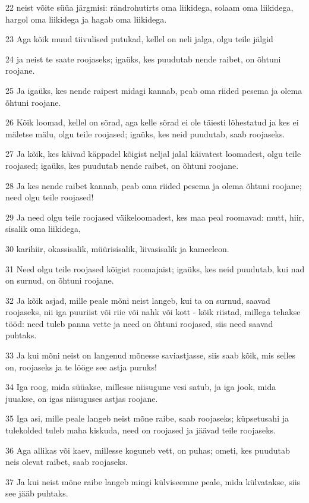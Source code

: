 \par 22 neist võite süüa järgmisi: rändrohutirts oma liikidega, solaam oma liikidega, hargol oma liikidega ja hagab oma liikidega.
\par 23 Aga kõik muud tiivulised putukad, kellel on neli jalga, olgu teile jälgid
\par 24 ja neist te saate roojaseks; igaüks, kes puudutab nende raibet, on õhtuni roojane.
\par 25 Ja igaüks, kes nende raipest midagi kannab, peab oma riided pesema ja olema õhtuni roojane.
\par 26 Kõik loomad, kellel on sõrad, aga kelle sõrad ei ole täiesti lõhestatud ja kes ei mäletse mälu, olgu teile roojased; igaüks, kes neid puudutab, saab roojaseks.
\par 27 Ja kõik, kes käivad käppadel kõigist neljal jalal käivatest loomadest, olgu teile roojased; igaüks, kes puudutab nende raibet, on õhtuni roojane.
\par 28 Ja kes nende raibet kannab, peab oma riided pesema ja olema õhtuni roojane; need olgu teile roojased!
\par 29 Ja need olgu teile roojased väikeloomadest, kes maa peal roomavad: mutt, hiir, sisalik oma liikidega,
\par 30 karihiir, okassisalik, müürisisalik, liivasisalik ja kameeleon.
\par 31 Need olgu teile roojased kõigist roomajaist; igaüks, kes neid puudutab, kui nad on surnud, on õhtuni roojane.
\par 32 Ja kõik asjad, mille peale mõni neist langeb, kui ta on surnud, saavad roojaseks, nii iga puuriist või riie või nahk või kott - kõik riistad, millega tehakse tööd: need tuleb panna vette ja need on õhtuni roojased, siis need saavad puhtaks.
\par 33 Ja kui mõni neist on langenud mõnesse saviastjasse, siis saab kõik, mis selles on, roojaseks ja te lööge see astja puruks!
\par 34 Iga roog, mida süüakse, millesse niisugune vesi satub, ja iga jook, mida juuakse, on igas niisuguses astjas roojane.
\par 35 Iga asi, mille peale langeb neist mõne raibe, saab roojaseks; küpsetusahi ja tulekolded tuleb maha kiskuda, need on roojased ja jäävad teile roojaseks.
\par 36 Aga allikas või kaev, millesse koguneb vett, on puhas; ometi, kes puudutab neis olevat raibet, saab roojaseks.
\par 37 Ja kui neist mõne raibe langeb mingi külviseemne peale, mida külvatakse, siis see jääb puhtaks.
